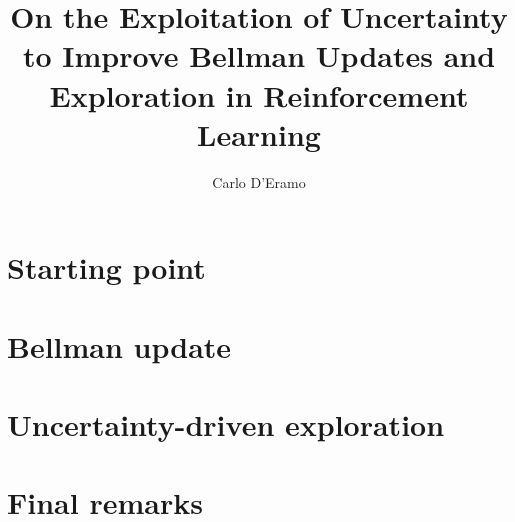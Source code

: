 \documentclass[10pt,twoside,openright,english,italian]{book}%
\author{Carlo D'Eramo}
\title{On the Exploitation of Uncertainty to Improve Bellman Updates and Exploration in Reinforcement Learning}
\begin{document}

\maketitle

\pagestyle{empty}

\cleardoublepage
\newpage

%

\cleardoublepage
\newpage

\pagestyle{fancy}
\setcounter{page}{1}



\tableofcontents
\cleardoublepage

\newpage

\listoffigures
\newpage
{}\listofalgorithms

\printglossaries

\cleardoublepage

\setcounter{page}{1}
\part{Starting point}

\part{Bellman update}


\part{Uncertainty-driven exploration}


\part{Final remarks}



\cleardoublepage
{}
{}
\small



\appendix

\end{document}
